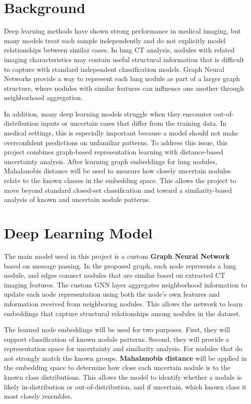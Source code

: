 \documentclass[12pt]{article}
\begin{document}
\section*{Background}

Deep learning methods have shown strong performance in medical imaging, but many models treat each sample independently and do not explicitly model relationships between similar cases. In lung CT analysis, nodules with related imaging characteristics may contain useful structural information that is difficult to capture with standard independent classification models. Graph Neural Networks provide a way to represent each lung nodule as part of a larger graph structure, where nodules with similar features can influence one another through neighborhood aggregation.

In addition, many deep learning models struggle when they encounter out-of-distribution inputs or uncertain cases that differ from the training data. In medical settings, this is especially important because a model should not make overconfident predictions on unfamiliar patterns. To address this issue, this project combines graph-based representation learning with distance-based uncertainty analysis. After learning graph embeddings for lung nodules, Mahalanobis distance will be used to measure how closely uncertain nodules relate to the known classes in the embedding space. This allows the project to move beyond standard closed-set classification and toward a similarity-based analysis of known and uncertain nodule patterns.

\section*{Deep Learning Model}

The main model used in this project is a custom \textbf{Graph Neural Network} based on message passing. In the proposed graph, each node represents a lung nodule, and edges connect nodules that are similar based on extracted CT imaging features. The custom GNN layer aggregates neighborhood information to update each node representation using both the node's own features and information received from neighboring nodules. This allows the network to learn embeddings that capture structural relationships among nodules in the dataset.

The learned node embeddings will be used for two purposes. First, they will support classification of known nodule patterns. Second, they will provide a representation space for uncertainty and similarity analysis. For nodules that do not strongly match the known groups, \textbf{Mahalanobis distance} will be applied in the embedding space to determine how close each uncertain nodule is to the known class distributions. This allows the model to identify whether a nodule is likely in-distribution or out-of-distribution, and if uncertain, which known class it most closely resembles.
\end{document}
